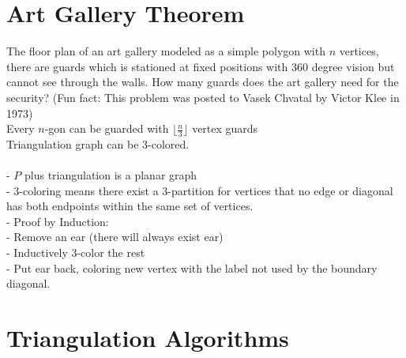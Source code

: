 		\section{Art Gallery Theorem}
			 The floor plan of an art gallery modeled as a simple polygon with $n$ vertices, there are guards which is stationed at fixed positions with 360 degree vision but cannot see through the walls. How many guards does the art gallery need for the security? (Fun fact: This problem was posted to Vasek Chvatal by Victor Klee in 1973)\\
			 Every $n$-gon can be guarded with $\lfloor \frac{n}{3} \rfloor$ vertex guards\\
			 Triangulation graph can be 3-colored.\\
			 \\
			- $P$ plus triangulation is a planar graph\\
			- 3-coloring means there exist a 3-partition for vertices that no edge or diagonal has both endpoints within the same set of vertices.\\
			- Proof by Induction:\\
			\indent - Remove an ear (there will always exist ear) \\
			\indent - Inductively 3-color the rest\\
			\indent - Put ear back, coloring new vertex with the label not used by the boundary diagonal.

		\section{Triangulation Algorithms}


